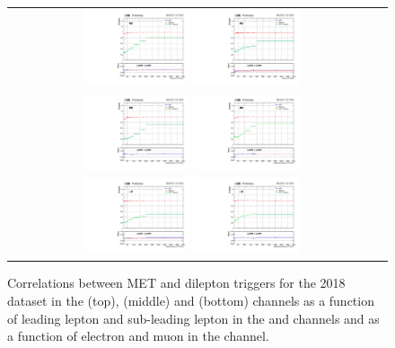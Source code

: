 \begin{figure}[!htb]
  \begin{center}
    \begin{tabular}{cc}
      \includegraphics[width=0.30\textwidth]{fig_2018_TrigSF/g_lepApt_emu_alpha.pdf}
      \includegraphics[width=0.30\textwidth]{fig_2018_TrigSF/g_lepBpt_emu_alpha.pdf}\\
      \includegraphics[width=0.30\textwidth]{fig_2018_TrigSF/g_lepApt_ee_alpha.pdf}
      \includegraphics[width=0.30\textwidth]{fig_2018_TrigSF/g_lepBpt_ee_alpha.pdf}\\
      \includegraphics[width=0.30\textwidth]{fig_2018_TrigSF/g_lepApt_mumu_alpha.pdf}
      \includegraphics[width=0.30\textwidth]{fig_2018_TrigSF/g_lepBpt_mumu_alpha.pdf}\\
    \end{tabular}
    \caption{Correlations between MET and dilepton triggers for the 2018 dataset in the \emu (top), \ee (middle) and \mumu (bottom) channels as a function of leading lepton \pT and sub-leading lepton \pT in the \ee and \mumu channels and as a function of electron \pT and muon \pT in the \emu channel.}
    \label{TrigSF_2018_5}
  \end{center}
\end{figure}


